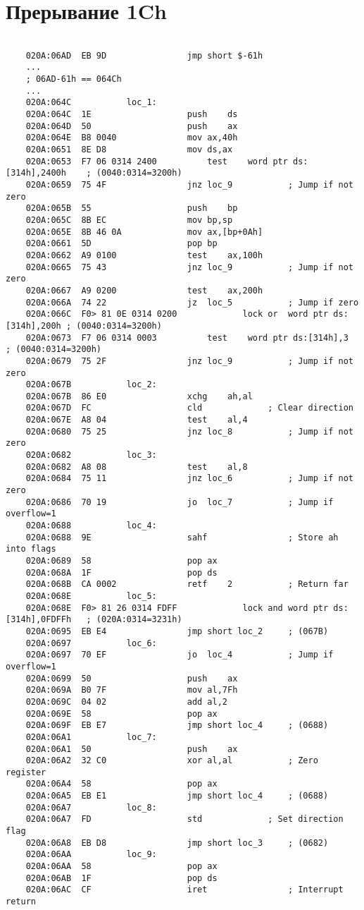 \documentclass[a4paper,12pt]{bmstu}
\begin{document}
\section{Прерывание 1Ch}\label{sec:dis_1ch}
\begin{lstlisting}[style={asm},label={lst:1ch}]

    020A:06AD  EB 9D				jmp	short $-61h
    ...
    ; 06AD-61h == 064Ch
    ...
    020A:064C			loc_1:
    020A:064C  1E					push	ds
    020A:064D  50					push	ax
    020A:064E  B8 0040				mov	ax,40h
    020A:0651  8E D8				mov	ds,ax
    020A:0653  F7 06 0314 2400			test	word ptr ds:[314h],2400h	; (0040:0314=3200h)
    020A:0659  75 4F				jnz	loc_9			; Jump if not zero
    020A:065B  55					push	bp
    020A:065C  8B EC				mov	bp,sp
    020A:065E  8B 46 0A				mov	ax,[bp+0Ah]
    020A:0661  5D					pop	bp
    020A:0662  A9 0100				test	ax,100h
    020A:0665  75 43				jnz	loc_9			; Jump if not zero
    020A:0667  A9 0200				test	ax,200h
    020A:066A  74 22				jz	loc_5			; Jump if zero
    020A:066C  F0> 81 0E 0314 0200	           lock	or	word ptr ds:[314h],200h	; (0040:0314=3200h)
    020A:0673  F7 06 0314 0003			test	word ptr ds:[314h],3	; (0040:0314=3200h)
    020A:0679  75 2F				jnz	loc_9			; Jump if not zero
    020A:067B			loc_2:
    020A:067B  86 E0				xchg	ah,al
    020A:067D  FC					cld				; Clear direction
    020A:067E  A8 04				test	al,4
    020A:0680  75 25				jnz	loc_8			; Jump if not zero
    020A:0682			loc_3:
    020A:0682  A8 08				test	al,8
    020A:0684  75 11				jnz	loc_6			; Jump if not zero
    020A:0686  70 19				jo	loc_7			; Jump if overflow=1
    020A:0688			loc_4:
    020A:0688  9E					sahf				; Store ah into flags
    020A:0689  58					pop	ax
    020A:068A  1F					pop	ds
    020A:068B  CA 0002				retf	2			; Return far
    020A:068E			loc_5:
    020A:068E  F0> 81 26 0314 FDFF	           lock	and	word ptr ds:[314h],0FDFFh	; (020A:0314=3231h)
    020A:0695  EB E4				jmp	short loc_2		; (067B)
    020A:0697			loc_6:
    020A:0697  70 EF				jo	loc_4			; Jump if overflow=1
    020A:0699  50					push	ax
    020A:069A  B0 7F				mov	al,7Fh
    020A:069C  04 02				add	al,2
    020A:069E  58					pop	ax
    020A:069F  EB E7				jmp	short loc_4		; (0688)
    020A:06A1			loc_7:
    020A:06A1  50					push	ax
    020A:06A2  32 C0				xor	al,al			; Zero register
    020A:06A4  58					pop	ax
    020A:06A5  EB E1				jmp	short loc_4		; (0688)
    020A:06A7			loc_8:
    020A:06A7  FD					std				; Set direction flag
    020A:06A8  EB D8				jmp	short loc_3		; (0682)
    020A:06AA			loc_9:
    020A:06AA  58					pop	ax
    020A:06AB  1F					pop	ds
    020A:06AC  CF					iret				; Interrupt return
\end{lstlisting}
\clearpage
\end{document}
